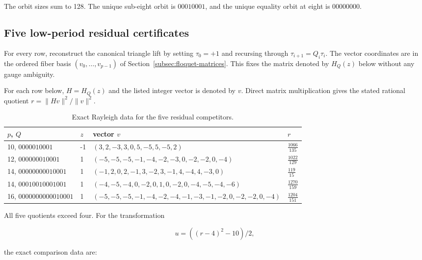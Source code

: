 The orbit sizes sum to 128. The unique sub-eight orbit is \(00010001\), and the
unique equality orbit at eight is \(00000000\).

\subsection{Five low-period residual certificates}

For every row, reconstruct the canonical triangle lift by setting
\(\tau_{0}=+1\) and recursing through \(\tau_{i+1}=Q_i \tau_i\). The vector coordinates
are in the ordered fiber basis \((v_{0},\ldots,v_{p-1})\) of Section~\ref{subsec:floquet-matrices}. This fixes
the matrix denoted by \(H_Q(z)\) below without any gauge ambiguity.

For each row below, \(H=H_Q(z)\) and the listed integer vector is denoted by
\(v\). Direct matrix multiplication gives the stated rational quotient
\(r=\lVert Hv\rVert^{2}/\lVert v\rVert^{2}\).

\begin{table}[tbp]
\centering
\caption{Exact Rayleigh data for the five residual competitors.}
\label{tab:residual-rayleigh-data}
\begingroup
\renewcommand{\arraystretch}{1.12}
\begin{tabular}{llll}
\toprule
\(p\), \(Q\) & \(z\) & vector \(v\) & \(r\) \\
\midrule
10, \(0000010001\) & -1 & \((3,2,-3,3,0,5,-5,5,-5,2)\) & \(\frac{1066}{135}\) \\
12, \(000000010001\) & 1 & \((-5,-5,-5,-1,-4,-2,-3,0,-2,-2,0,-4)\) & \(\frac{1022}{129}\) \\
14, \(00000000010001\) & 1 & \((-1,2,0,2,-1,3,-2,3,-1,4,-4,4,-3,0)\) & \(\frac{119}{15}\) \\
14, \(00010010001001\) & 1 & \((-4,-5,-4,0,-2,0,1,0,-2,0,-4,-5,-4,-6)\) & \(\frac{1270}{159}\) \\
16, \(0000000000010001\) & 1 & \((-5,-5,-5,-1,-4,-2,-4,-1,-3,-1,-2,0,-2,-2,0,-4)\) & \(\frac{1204}{151}\) \\
\bottomrule
\end{tabular}
\endgroup
\end{table}

All five quotients exceed four. For the transformation

\begin{equation}
u=((r-4)^{2}-10)/2,
\end{equation}

the exact comparison data are:

